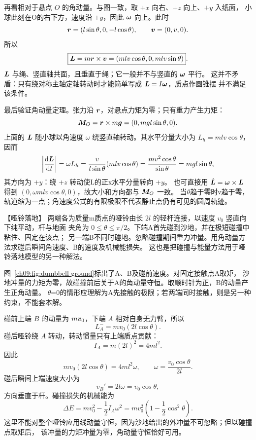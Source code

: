 {\begin{xesolution}
再看相对于悬点 $O$ 的角动量。与图一致，取 $+x$ 向右、$+z$ 向上、$+y$ 入纸面，
小球此刻在O的右下方，速度沿 $+y$，因此 $\bm{\omega}$ 向上。此时
\[
 \bm{r}=(l\sin\theta,0,-l\cos\theta),\qquad
 \bm{v}=(0,v,0).
\]
所以
\[
 \boxed{\bm{L}=m\bm{r}\times\bm{v}
 =(mlv\cos\theta,0,mlv\sin\theta)}.
\]
$\bm{L}$ 与绳、竖直轴共面，且垂直于绳；它一般并不与竖直的 $\bm{\omega}$ 平行。
这并不矛盾：只有绕对称主轴定轴转动时才能简单写成 $\bm{L}=I\bm{\omega}$，质点作圆锥摆
并不满足该条件。

最后验证角动量定理。张力沿 $\bm{r}$，对悬点力矩为零；只有重力产生力矩：
\[
 \bm{M}_O=\bm{r}\times m\bm{g}=(0,mgl\sin\theta,0).
\]
上面的 $\bm{L}$ 随小球以角速度 $\omega$ 绕竖直轴转动。其水平分量大小为
$L_h=mlv\cos\theta$，因而
\[
 \left|\frac{\mathop{}\!\mathrm d\bm{L}}{\mathop{}\!\mathrm d t}\right|
 =\omega L_h
 =\frac{v}{l\sin\theta}(mlv\cos\theta)
 =\frac{mv^2\cos\theta}{\sin\theta}
 =mgl\sin\theta,
\]
其方向为 $+y$：绕 $+z$ 转动使L的正x水平分量转向 $+y$。
也可直接用 $\dot{\bm{L}}=\bm{\omega}\times\bm{L}$
得到 $(0,\omega mlv\cos\theta,0)$，故大小和方向都与 $\bm{M}_O$ 一致。
当$\theta$趋于零时v趋于零，轨道缩为一点；角速度公式的有限极限不代表静止点仍有可见的圆周轨迹。
\end{xesolution}

\begin{origexamplebox}{【哑铃落地】}\label{ch09:ex:s16-14-5}
两端各为质量m质点的哑铃由长 $2l$ 的轻杆连接，以速度 $v_0$ 竖直向下纯平动，杆与地面
夹角为 $0\le\theta\le\pi/2$。下端A首先碰到沙地，并在极短碰撞中粘住、固定在该点；
另一端B不同时碰地。忽略碰撞期间重力冲量。用角动量方法求碰后瞬间角速度、B的速度及机械能损失。
这也是把碰撞与能量方法用于哑铃落地模型的另一种解法。


\ThQDumbbell
\end{origexamplebox}

\begin{xesolution}
\dumbbellGroundDiagram

图~\ref{ch09:fig:dumbbell-ground}标出了A、B及碰前速度。对固定接触点A取矩，
沙地冲量的力矩为零，故碰撞前后关于A的角动量守恒。取顺时针为正，B的动量产生正角动量。
$\theta$=0的情形应理解为A先接触的极限；若两端同时接触，则是另一种约束，不能套本解。

碰前上端 $B$ 的动量为 $m\bm{v}_0$，下端 $A$ 相对自身无力臂，所以
\[
 L_A^-=m v_0(2l\cos\theta).
\]
碰后哑铃绕 $A$ 转动，转动惯量只有上端质点贡献：
\[
 I_A=m(2l)^2=4ml^2.
\]
因此
\[
 m v_0(2l\cos\theta)=4ml^2\omega,
 \qquad
 \boxed{\omega=\frac{v_0\cos\theta}{2l}}.
\]
碰后瞬间上端速度大小为
\[
 \boxed{v_B'=2l\omega=v_0\cos\theta},
\]
方向垂直于杆。碰撞损失的机械能为
\[
 \Delta E
 =mv_0^2-\frac12I_A\omega^2
 =\boxed{mv_0^2\left(1-\frac12\cos^2\theta\right)}.
\]
这里不能对整个哑铃应用线动量守恒，因为沙地给出的外冲量不可忽略；但以碰撞点取矩后，
该冲量的力矩冲量为零，角动量守恒恰好可用。
\end{xesolution}

}
